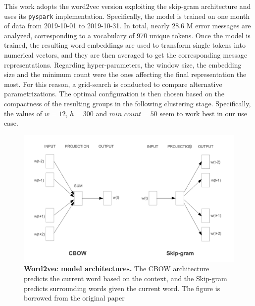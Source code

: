 This work adopts the word2vec version exploiting the skip-gram architecture and uses its \texttt{pyspark} implementation.
Specifically, the model is trained on one month of data from 2019-10-01 to 2019-10-31.
In total, nearly 28.6 M error messages are analyzed, corresponding to a vocabulary of 970 unique tokens.
Once the model is trained, the resulting word embeddings are used to transform single tokens into numerical vectors, and they are then averaged to get the corresponding message representations.
Regarding hyper-parameters, the window size, the embedding size and the minimum count were the ones affecting the final representation the most.
For this reason, a grid-search is conducted to compare alternative parametrizations.  
The optimal configuration is then chosen based on the compactness of the resulting groups in the following clustering stage.
Specifically, the values of $w=12$, $h=300$ and $min\_count=50$ seem to work best in our use case.

\begin{figure}
    \centering
    \includegraphics[width=\textwidth]{figures/410_method/word2vec.png}
    \caption{\textbf{Word2vec model architectures.} The CBOW architecture predicts the current word based on the
context, and the Skip-gram predicts surrounding words given the current word. The figure is borrowed from the original paper \protect \cite{mikolov2013word2vec}
}
    \label{fig:word2vec}
\end{figure}